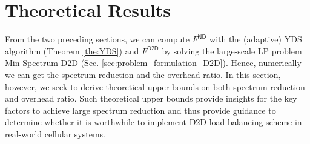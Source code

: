 \section{Theoretical Results} \label{sec:theoretical_results}
From the two preceding sections, we can compute $F^{\textsf{ND}}$ with
the (adaptive) YDS algorithm (Theorem \ref{the:YDS}) and $F^{\textsf{D2D}}$ by
solving the large-scale LP problem \textsf{Min-Spectrum-D2D} (Sec. \ref{sec:problem_formulation_D2D}).
Hence, numerically we can get the  spectrum reduction and
the overhead ratio. In this section, however, we seek to
derive theoretical upper bounds on both spectrum reduction and overhead ratio.
Such theoretical upper bounds provide insights for the key factors to
achieve large spectrum reduction and thus provide guidance to determine whether
it is worthwhile to implement D2D load balancing scheme in real-world cellular systems.

%

%


